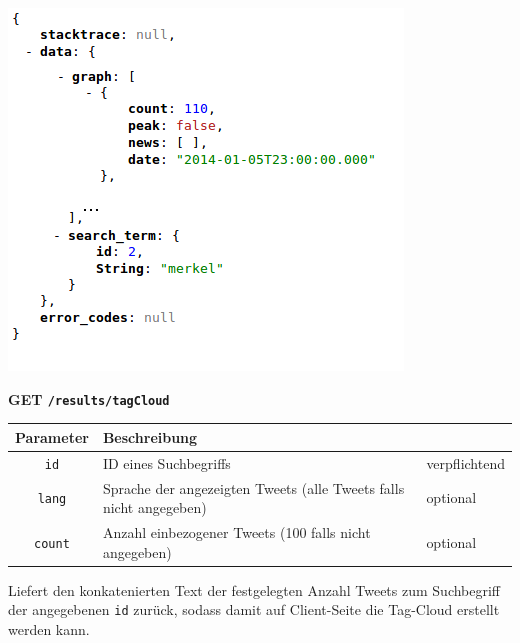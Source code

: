\includegraphics[scale=0.6]{Bilder/RestApi/resultsCountPerHour.png}

\newpage
\noindent
\textbf{GET \texttt{/results/tagCloud}}
\begin{table}[h!]
\begin{tabular}{| c | p{\tweite} | l |}
\hline
	\textbf{Parameter} & \textbf{Beschreibung} &  \\
\hline \hline
 	\texttt{id} & ID eines Suchbegriffs & verpflichtend \\
\hline
 	\texttt{lang} & Sprache der angezeigten Tweets (alle Tweets falls nicht angegeben) & optional \\
\hline
 	\texttt{count} &  Anzahl einbezogener Tweets (100 falls nicht angegeben) & optional \\
\hline
\end{tabular}
\end{table}
\newline
Liefert den konkatenierten Text der festgelegten Anzahl Tweets zum Suchbegriff der angegebenen \texttt{id} zurück, sodass damit auf Client-Seite die Tag-Cloud erstellt werden kann.

